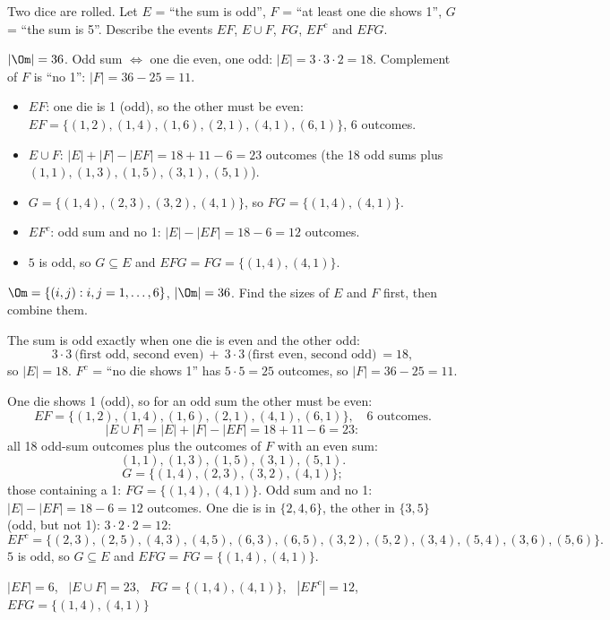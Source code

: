 
\begin{problem}
	Two dice are rolled. Let $E$ = ``the sum is odd'', $F$ = ``at least one die
	shows 1'', $G$ = ``the sum is 5''. Describe the events $EF$, $E\cup F$,
	$FG$, $EF^c$ and $EFG$.
\end{problem}

\begin{slides}
	\small
	\exstatement
	\pause
	\sol $|\Om|=36$. Odd sum $\iff$ one die even, one odd:
	$|E|=3\cdot3\cdot2=18$. Complement of $F$ is ``no 1'': $|F|=36-25=11$.
	\begin{itemize}
		\item $EF$: one die is 1 (odd), so the other must be even:
		      $EF=\{(1,2),(1,4),(1,6),(2,1),(4,1),(6,1)\}$, 6 outcomes.
		\item $E\cup F$: $|E|+|F|-|EF|=18+11-6=23$ outcomes (the 18 odd sums
		      plus $(1,1),(1,3),(1,5),(3,1),(5,1)$).
		\item $G=\{(1,4),(2,3),(3,2),(4,1)\}$, so $FG=\{(1,4),(4,1)\}$.
		\item $EF^c$: odd sum and no 1: $|E|-|EF|=18-6=12$ outcomes.
		\item $5$ is odd, so $G\subseteq E$ and $EFG=FG=\{(1,4),(4,1)\}$.
	\end{itemize}
\end{slides}

\begin{solution}
	\idea $\Om=\{(i,j):i,j=1,\dots,6\}$, $|\Om|=36$. Find the sizes of $E$ and
	$F$ first, then combine them.

	 The sum is odd exactly when one die is even and the
	other odd:
	\[ 3\cdot3\ \text{(first odd, second even)}\ +\ 3\cdot3\ \text{(first even,
			second odd)}\ =18, \]
	so $|E|=18$. $F^c$ = ``no die shows 1'' has $5\cdot5=25$
	outcomes, so $|F|=36-25=11$.

	 One die shows 1 (odd), so for an odd sum the other must be even:
	\[ EF=\{(1,2),(1,4),(1,6),(2,1),(4,1),(6,1)\},\quad 6\text{ outcomes}. \]
	\[ |E\cup F|=|E|+|F|-|EF|=18+11-6=23: \]
	all 18 odd-sum outcomes plus the outcomes of $F$ with an even sum:
	\[ (1,1),(1,3),(1,5),(3,1),(5,1). \]
	\[ G=\{(1,4),(2,3),(3,2),(4,1)\}; \]
	those containing a 1: $FG=\{(1,4),(4,1)\}$.
	 Odd sum and no 1: $|E|-|EF|=18-6=12$ outcomes. One die
	is in $\{2,4,6\}$, the other in $\{3,5\}$ (odd, but not 1): $3\cdot2\cdot2=12$:
	\[ EF^c=\{(2,3),(2,5),(4,3),(4,5),(6,3),(6,5),(3,2),(5,2),(3,4),(5,4),
		(3,6),(5,6)\}. \]
	 $5$ is odd, so $G\subseteq E$ and $EFG=FG=\{(1,4),(4,1)\}$.
	\begin{answer}
		$|EF|=6$, \ $|E\cup F|=23$, \ $FG=\{(1,4),(4,1)\}$, \ $|EF^c|=12$, \
		$EFG=\{(1,4),(4,1)\}$
	\end{answer}
\end{solution}
